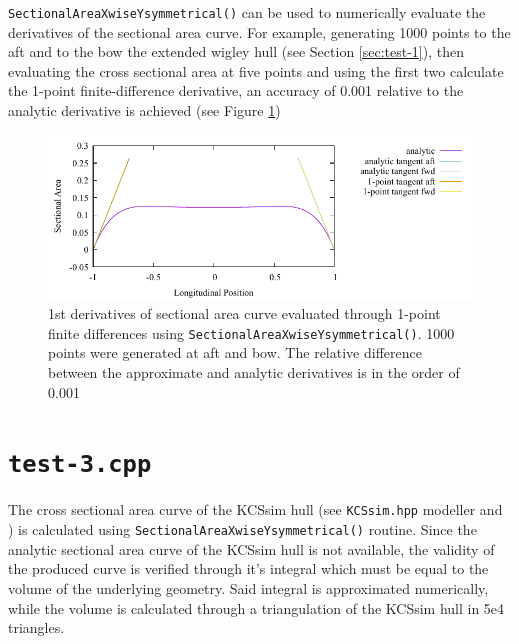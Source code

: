 \documentclass{report}
\begin{document}
\newpar \texttt{SectionalAreaXwiseYsymmetrical()} can be used to numerically evaluate the derivatives of the sectional area curve.
For example, generating 1000 points to the aft and to the bow the extended wigley hull (see Section \ref{sec:test-1}), then evaluating 
the cross sectional area at five points and using the first two calculate the 1-point finite-difference derivative, an accuracy of 
0.001 relative to the analytic derivative is achieved (see Figure \ref{fig:test-2-1K-l-100-derivatives})
\begin{figure}[H]
    \centering
    \includegraphics[width=0.7\linewidth]{figures/test-2-1K-l-100-derivatives.pdf}
    \caption{1st derivatives of sectional area curve evaluated through 1-point finite differences using \texttt{SectionalAreaXwiseYsymmetrical()}. 
    1000 points were generated at aft and bow. The relative difference between the approximate
    and analytic derivatives is in the order of 0.001}
    \label{fig:test-2-1K-l-100-derivatives}
\end{figure}

\section{\texttt{test-3.cpp}}\label{sec:test-3}

\newpar The cross sectional area curve of the KCSsim hull (see \texttt{KCSsim.hpp} modeller and \cite{KHAN2022103339}) is calculated 
using \texttt{SectionalAreaXwiseYsymmetrical()} routine. Since the analytic sectional area curve of 
the KCSsim hull is not available, the validity of the produced curve is verified through it's 
integral which must be equal to the volume of the underlying geometry. Said integral is approximated 
numerically, while the volume is calculated through a triangulation of the KCSsim hull in 5e4 triangles.
\end{document}
